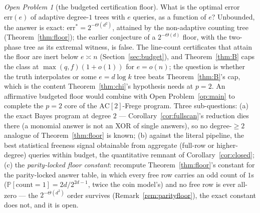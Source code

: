 \documentclass[11pt]{article}
\theoremstyle{definition}
\theoremstyle{remark}
\newtheorem{openproblem}{Open Problem}
\newcommand{\Prob}{\mathbb{P}}
\newcommand{\AC}{\mathrm{AC}}
\begin{document}
\begin{openproblem}[the budgeted certification floor]\label{op:floor}
What is the optimal error $\mathrm{err}(e)$ of adaptive degree-$1$
trees with $e$ queries, as a function of $e$?  Unbounded, the answer
is exact: $\mathrm{err}^*=2^{-\Theta(d^2)}$, attained by the
non-adaptive counting tree (Theorem~\ref{thm:floor}); the earlier
conjecture of a $2^{-\Theta(d)}$ floor, with the two-phase tree as its
extremal witness, is false.  The line-count certificates that attain
the floor are inert below $e\asymp n$ (Section~\ref{sec:budget}), and
Theorem~\ref{thm:B} caps the class at $\max(q,f)(1+o(1))$ for
$e=o(n)$; the question is whether the truth interpolates or some
$e=d\log k$ tree beats Theorem~\ref{thm:B}'s cap, which is the content
Theorem~\ref{thm:chi}'s hypothesis needs at $p=2$.  An affirmative
budgeted floor would combine with Open Problem~\ref{op:main} to
complete the $p=2$ core of the $\AC[2]$-Frege program.  Three
sub-questions: (a) the exact Bayes program at degree $2$ ---
Corollary~\ref{cor:fullscan}'s reduction dies there (a monomial answer
is not an XOR of single answers), so no degree-$\ge2$ analogue of
Theorem~\ref{thm:floor} is known; (b) against the literal pipeline,
the best statistical freeness signal obtainable from aggregate
(full-row or higher-degree) queries within budget, the quantitative
remnant of Corollary~\ref{cor:closed}; (c) the \emph{parity-locked
floor constant}: recompute Theorem~\ref{thm:floor}'s constant for the
parity-locked answer table, in which every free row carries an odd
count of $1$s ($\Prob[\text{count}=1]=2d/2^{2d-1}$, twice the coin
model's) and no free row is ever all-zero --- the $2^{-\Theta(d^2)}$
order survives (Remark~\ref{rem:parityfloor}), the exact constant does
not, and it is open.
\end{openproblem}
\end{document}
